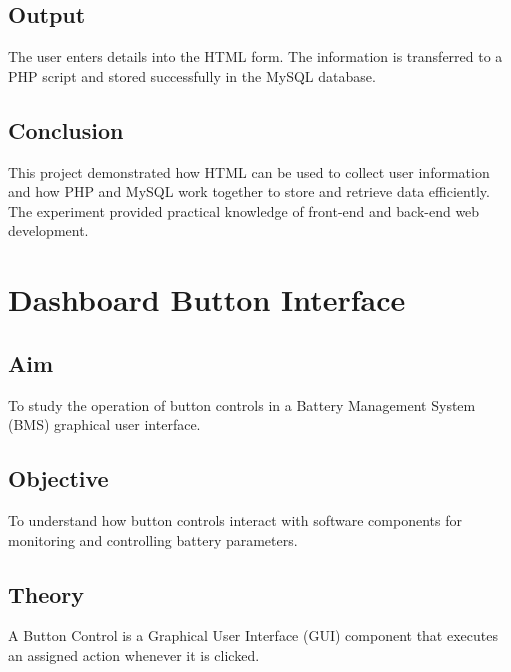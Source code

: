 \documentclass[12pt,a4paper]{report}
\begin{document}

\section{Output}

The user enters details into the HTML form. The information is transferred to a PHP script and stored successfully in the MySQL database.


\section{Conclusion}

This project demonstrated how HTML can be used to collect user information and how PHP and MySQL work together to store and retrieve data efficiently. The experiment provided practical knowledge of front-end and back-end web development.

\newpage


\chapter{Dashboard Button Interface}

\section{Aim}

To study the operation of button controls in a Battery Management System (BMS) graphical user interface.

\section{Objective}

To understand how button controls interact with software components for monitoring and controlling battery parameters.

\section{Theory}

A Button Control is a Graphical User Interface (GUI) component that executes an assigned action whenever it is clicked.
\end{document}
